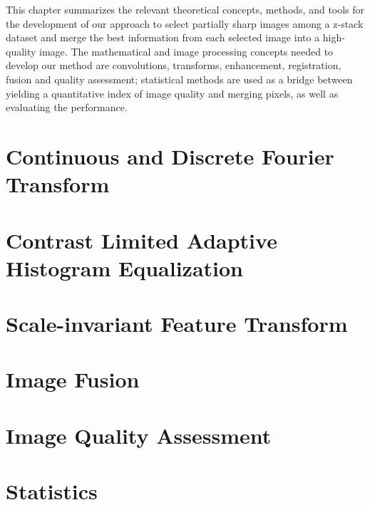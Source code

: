 
\vspace{-1cm}

This chapter summarizes the relevant theoretical concepts, methods, and tools for the development of our approach to select partially sharp images among a z-stack dataset and merge the best information from each selected image into a high-quality image. The mathematical and image processing concepts needed to develop our method are convolutions, transforms, enhancement, registration, fusion and quality assessment; statistical methods are used as a bridge between yielding a quantitative index of image quality and merging pixels, as well as evaluating the performance. 

% 

\section{Continuous and Discrete Fourier Transform}


\section{Contrast Limited Adaptive Histogram Equalization}


\section{Scale-invariant Feature Transform}


\section{Image Fusion}


\section{Image Quality Assessment}


\section{Statistics}
